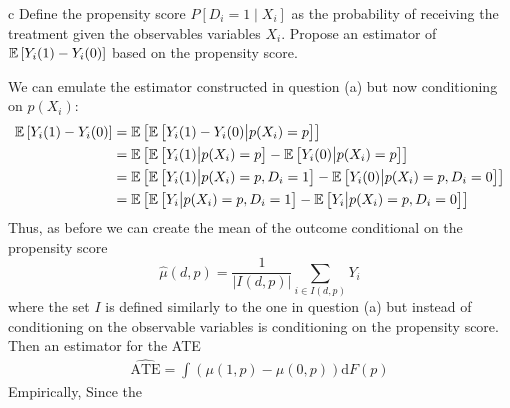 \documentclass{article}
\begin{document}
\begin{problem}{c}
Define the propensity score $P\left[D_{i}=1 \mid X_{i}\right]$ as the probability of receiving the treatment given the observables variables $X_{i}$. Propose an estimator of $\mathbb{E}\left[Y_{i}(1)-Y_{i}(0)\right]$ based on the propensity score.
\end{problem}
\begin{solution}
We can emulate the estimator constructed in question (a) but now conditioning on $p(X_i)$: 
\begin{align*}
    \mathbb{E}\left[Y_{i}(1)-Y_{i}(0)\right] &= \mathbb{E}\left[\mathbb{E}\left[Y_{i}(1)-Y_{i}(0)\big\vert p(X_i) = p\right]\right] \\ 
    &= \mathbb{E}\left[\mathbb{E}\left[Y_{i}(1)\big\vert p(X_i) = p\right]-\mathbb{E}\left[Y_{i}(0)\big\vert p(X_i) = p\right]\right] \\ 
    &= \mathbb{E}\left[\mathbb{E}\left[Y_{i}(1)\big\vert p(X_i) = p,D_i=1\right]-\mathbb{E}\left[Y_{i}(0)\big\vert p(X_i) = p, D_i=0\right]\right] \\ 
    &= \mathbb{E}\left[\mathbb{E}\left[Y_{i}\big\vert p(X_i) = p,D_i=1\right]-\mathbb{E}\left[Y_{i}\big\vert p(X_i) = p, D_i=0\right]\right]
\end{align*}
Thus, as before we can create the mean of the outcome conditional on the propensity score
\begin{equation*}
     \hat{\mu}(d,p) = \frac{1}{\vert I(d,p)\vert} \sum_{i\in I(d,p)} Y_i
\end{equation*}
where the set $I$ is defined similarly to the one in question (a) but instead of conditioning on the observable variables is conditioning on the propensity score. Then an estimator for the ATE
\begin{align*}
\widehat{\text{ATE}} = \int \left(\mu(1,p)-\mu(0,p)\right)\mathrm{d}F(p)
\end{align*}
Empirically, Since the 
\end{solution}

\newpage
\end{document}

